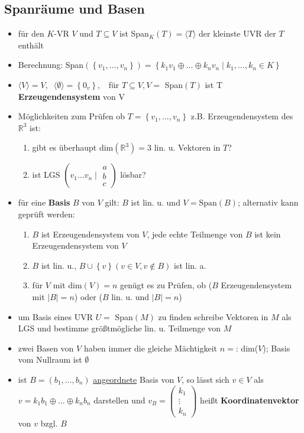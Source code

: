 \documentclass[10pt,a4paper]{article}
\begin{document}
\subsection{Spanräume und Basen}
\begin{itemize}
\item für den $K$-VR $V$ und $T\subseteq V$ ist Span$_{K}(T)=\langle T \rangle$ der kleinste UVR der $T$ enthält \item Berechnung: Span$(\left\lbrace v_{1},\dotsc ,v_{n}\right\rbrace)=\left\lbrace k_{1}v_{1}\oplus \dotsc \oplus k_{n}v_{n}\mid k_{1},\dotsc ,k_{n} \in K\right\rbrace $
\item $\langle V\rangle =V, \;\; \langle \emptyset \rangle =\left\lbrace 0_{v} \right\rbrace,\;\;$ für $T\subseteq V,V=$ Span$(T)$ ist T \textbf{Erzeugendensystem} von V
\item Möglichkeiten zum Prüfen ob $T=\left\lbrace  v_{1}, \dotsc, v_{n} \right\rbrace$ z.B. Erzeugendensystem des $\mathbb{R}^{3}$ ist: 
\begin{enumerate}
\item gibt es überhaupt dim$(\mathbb{R}^3)=3$ lin. u. Vektoren in $T$?
\item ist LGS $\left(v_{1} \dotsc v_{n} \mid \begin{matrix} a\\  b\\c\end{matrix}\right)$ lösbar? 
\end{enumerate}
\item für eine \textbf{Basis} $B$ von $V$ gilt: $B$ ist lin. u. und $V=\text{Span}(B)$; alternativ kann geprüft werden: \begin{enumerate}
\item $B$ ist Erzeugendensystem von $V$, jede echte Teilmenge von $B$ ist kein Erzeugendensystem von $V$
\item $B$ ist lin. u., $B\cup \left\lbrace v \right\rbrace (v \in V,v\not\in B)$ ist lin. a. 
\item für $V$ mit dim$(V)=n$ genügt es zu Prüfen, ob ($B$ Erzeugendensystem mit $\vert B\vert=n$) oder ($B$ lin. u. und $\vert B\vert=n$)
\end{enumerate}
\item um Basis eines UVR $U=$ Span$(M)$ zu finden schreibe Vektoren in $M$ als LGS und bestimme größtmögliche lin. u. Teilmenge von $M$ 
\item zwei Basen von $V$ haben immer die gleiche Mächtigkeit $n=:\, $dim($V$); Basis vom Nullraum ist $\emptyset$
\item ist $B=(b_{1},\dotsc,b_{n})$ \underline{angeordnete} Basis von $V$, so lässt sich $v\in V$ als $v=k_{1}b_{1}\oplus\dotsc  \oplus k_{n}b_{n}$ darstellen und $v_{B}=\begin{pmatrix} k_{1}\\ \vdots\\ k_{n} \end{pmatrix}$ heißt \textbf{Koordinatenvektor} von $v$ bzgl. $B$ 
\end{itemize}
\end{document}
